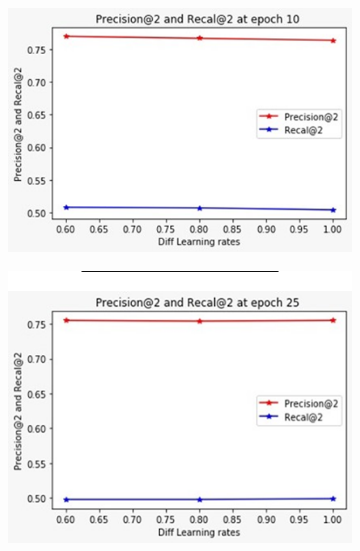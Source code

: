 \documentclass[a4paper,1pt]{article}
\begin{document}
\begin{figure}[h!]
	
	\centering
	\begin{subfigure}[b]{0.4\linewidth}
		\includegraphics[width=1.0\linewidth]{"screenshot003"}
		
	\end{subfigure}
	\begin{subfigure}[b]{0.4\linewidth}
		\includegraphics[width=1.0\linewidth]{"screenshot004"}
		
	\end{subfigure}
\end{figure}
\end{document}
